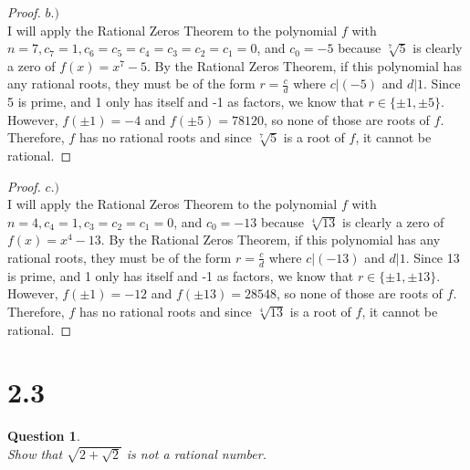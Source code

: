 \documentclass[10pt,a4paper]{article}
\newtheorem*{question*}{Question}
\begin{document}
\begin{proof}{$b.)$}
\\I will apply the Rational Zeros Theorem to the polynomial $f$ with $n = 7, c_7 = 1, c_6 = c_5 = c_4 = c_3 = c_2 = c_1 = 0$, and $c_0 = -5$ because $\sqrt[7]{5}$ is clearly a zero of $f(x) = x^7 - 5$. By the Rational Zeros Theorem, if this polynomial has any rational roots, they must be of the form $r = \frac{c}{d}$ where $c|(-5)$ and $d|1$. Since 5 is prime, and 1 only has itself and -1 as factors, we know that $r \in \{\pm 1,\pm 5\}$. However, $f(\pm 1) = -4$ and $f(\pm 5) = 78120$, so none of those are roots of $f$. Therefore, $f$ has no rational roots and since $\sqrt[7]{5}$ is a root of $f$, it cannot be rational. 
\end{proof}

\begin{proof}{$c.)$}
\\I will apply the Rational Zeros Theorem to the polynomial $f$ with $n = 4, c_4 = 1, c_3 = c_2 = c_1 = 0$, and $c_0 = -13$ because $\sqrt[4]{13}$ is clearly a zero of $f(x) = x^4 - 13$. By the Rational Zeros Theorem, if this polynomial has any rational roots, they must be of the form $r = \frac{c}{d}$ where $c|(-13)$ and $d|1$. Since 13 is prime, and 1 only has itself and -1 as factors, we know that $r \in \{\pm 1,\pm 13\}$. However, $f(\pm 1) = -12$ and $f(\pm 13) = 28548$, so none of those are roots of $f$. Therefore, $f$ has no rational roots and since $\sqrt[4]{13}$ is a root of $f$, it cannot be rational. 
\end{proof}

\section*{2.3}
\begin{question*}{$ $}
\\Show that $\sqrt{2 + \sqrt{2}}$ is not a rational number. 
\end{question*}
\end{document}
